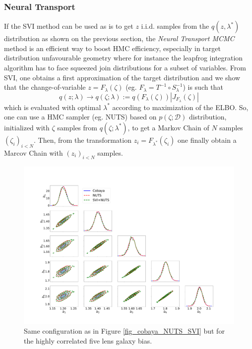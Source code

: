 \documentclass[twocolumn,twocolappendix,nofootinbib,iop]{openjournal}
\newcommand{\bydef}{:=}
\begin{document}
\subsubsection{Neural Transport}
\label{sec-Neural-Reparametrisation}
%
If the SVI method can be used as is to get $z$ i.i.d. samples from the $q(z,\lambda^\ast)$ distribution as shown on the previous section, the \textit{Neural Transport MCMC} method \citep{2014arXiv1412.5492P,2019arXiv190303704H} is an efficient way to boost HMC efficiency, especially in target distribution unfavourable geometry where for instance the leapfrog integration algorithm has to face squeezed join distributions for a subset of variables. From SVI, one obtains a first approximation of the target distribution and we show that the change-of-variable $z=F_\lambda(\zeta)$ (eg. $F_\lambda=T^{-1}\circ S^{-1}_\lambda$) is such that
\begin{equation}
q(z;\lambda) \rightarrow q(\zeta;\lambda) \bydef q(F_\lambda(\zeta)) |J_{F_\lambda}(\zeta)|
\end{equation}
which is evaluated with optimal $\lambda^\ast$ according to maximization of the ELBO. So, one can use a HMC sampler (eg. NUTS) based on $p(\zeta;\mathcal{D})$ distribution, initialized with $\zeta$ samples from $q(\zeta;\lambda^\ast)$, to get a Markov Chain of $N$ samples $(\zeta_i)_{i<N}$. Then, from the transformation  $z_i=F_{\lambda^\ast}(\zeta_i)$ one finally obtain a Marcov Chain with $(z_i)_{i<N}$ samples. 
\begin{figure}
\centering
\includegraphics[width=1.5\columnwidth]{figures/fig_Cobaya-NUTS-SVI200_bis_v1.pdf}
\caption{Same configuration as in Figure \ref{fig_cobaya_NUTS_SVI} but for the highly correlated five lens galaxy bias.}
\label{fig_cobaya_NUTS_SVI_bis}
\end{figure}
\end{document}
